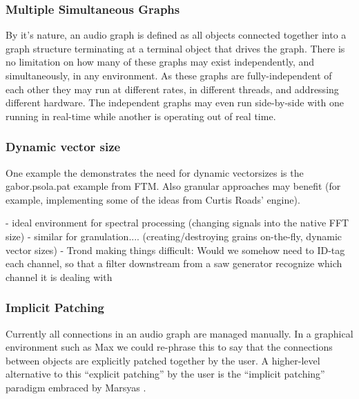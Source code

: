\documentclass[twoside,a4paper]{article}
\begin{document}
\subsubsection{Multiple Simultaneous Graphs} %

By it's nature, an audio graph is defined as all objects connected together into a graph structure terminating at a terminal object that drives the graph.  
There is no limitation on how many of these graphs may exist independently, and simultaneously, in any environment.  
As these graphs are fully-independent of each other they may run at different rates, in different threads, and addressing different hardware.  The independent graphs may even run side-by-side with one running in real-time while another is operating out of real time.



\subsubsection{Dynamic vector size} %


One example the demonstrates the need for dynamic vectorsizes is the gabor.psola.pat example from FTM. 
Also granular approaches may benefit (for example, implementing some of the ideas from Curtis Roads' engine).

- ideal environment for spectral processing (changing signals into the native FFT size)
- similar for granulation.... (creating/destroying grains on-the-fly, dynamic vector sizes)
- Trond making things difficult: Would we somehow need to ID-tag each channel, so that a filter downstream from a saw generator recognize which channel it is dealing with




\subsubsection{Implicit Patching} %

Currently all connections in an audio graph are managed manually.  In a graphical environment such as Max we could re-phrase this to say that the connections between objects are explicitly patched together by the user.  A higher-level alternative to this ``explicit patching'' by the user is the ``implicit patching'' paradigm embraced by Marsyas \cite{Bray:2005}.
\end{document}
